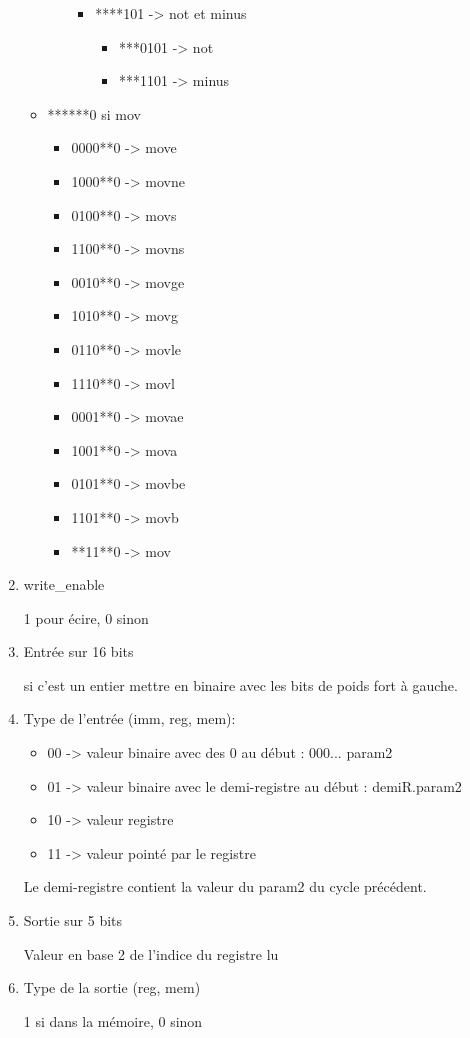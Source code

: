 \documentclass[10pt,a4paper,notitlepage ]{article}
\begin{document}
\begin{enumerate}
\begin{itemize}
\begin{itemize}
\begin{itemize}
\item ****101 -> not et minus
\begin{itemize}
\item ***0101 -> not
\item ***1101 -> minus
\end{itemize}
\end{itemize}
\end{itemize}
\item ******0 si mov
\begin{itemize}
\item 0000**0 -> move
\item 1000**0 -> movne
\item 0100**0 -> movs
\item 1100**0 -> movns
\item 0010**0 -> movge
\item 1010**0 -> movg
\item 0110**0 -> movle
\item 1110**0 -> movl
\item 0001**0 -> movae
\item 1001**0 -> mova
\item 0101**0 -> movbe
\item 1101**0 -> movb
\item **11**0 -> mov
\end{itemize}

\end{itemize}

\item write\_enable

1 pour écire, 0 sinon

\item Entrée sur 16 bits

si c'est un entier mettre en binaire avec les bits de poids fort à gauche.

\item Type de l'entrée (imm, reg, mem):
	\begin{itemize}
		\item 00 -> valeur binaire avec des 0 au début : 000... param2
		\item 01 -> valeur binaire avec le demi-registre au début : demiR.param2
		\item 10 -> valeur registre
		\item 11 -> valeur pointé par le registre
	\end{itemize}

Le demi-registre contient la valeur du param2 du cycle précédent.

\item Sortie sur 5 bits

Valeur en base 2 de l'indice du registre lu

\item Type de la sortie (reg, mem)

1 si dans la mémoire, 0 sinon


\end{enumerate}
\end{document}
